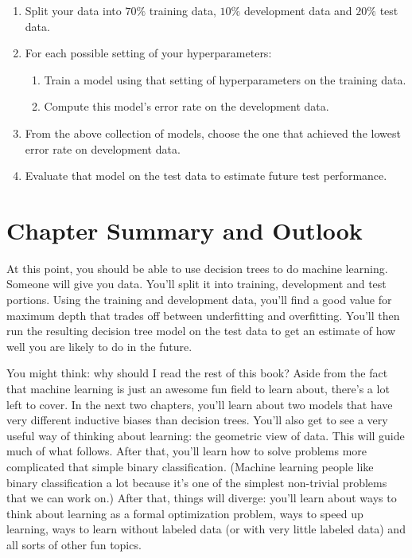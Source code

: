 \begin{enumerate}
\item Split your data into $70\%$ training data, $10\%$ development
  data and $20\%$ test data.

\item For each possible setting of your hyperparameters:

\begin{enumerate}
\item Train a model using that setting of hyperparameters on the
  training data.

\item Compute this model's error rate on the development data.
\end{enumerate}

\item From the above collection of models, choose the one that
  achieved the lowest error rate on development data.

\item Evaluate that model on the test data to estimate future test
  performance.
\end{enumerate}


\section{Chapter Summary and Outlook}

At this point, you should be able to use decision trees to do machine
learning.  Someone will give you data.  You'll split it into
training, development and test portions.  Using the training and
development data, you'll find a good value for maximum depth that
trades off between underfitting and overfitting.  You'll then run the
resulting decision tree model on the test data to get an estimate of
how well you are likely to do in the future.

You might think: why should I read the rest of this book?  Aside from
the fact that machine learning is just an awesome fun field to learn
about, there's a lot left to cover.  In the next two chapters, you'll
learn about two models that have very different inductive biases than
decision trees.  You'll also get to see a very useful way of thinking
about learning: the geometric view of data.  This will guide much of
what follows.  After that, you'll learn how to solve problems more
complicated that simple binary classification.  (Machine learning
people like binary classification a lot because it's one of the
simplest non-trivial problems that we can work on.)  After that,
things will diverge: you'll learn about ways to think about learning
as a formal optimization problem, ways to speed up learning, ways to
learn without labeled data (or with very little labeled data) and all
sorts of other fun topics.

